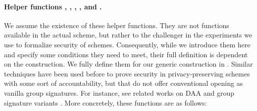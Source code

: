 \paragraph{Helper functions \SimSetup, \ExtractIssue, \ExtractSign,
  \IdentifyCred, and \IdentifyUK.} We assume the existence of these helper
functions. They are not functions available in the actual scheme, but rather to
the challenger in the experiments we use to formalize security of \UAS schemes.
Consequently, while we introduce them here and specify some conditions they need
to meet, their full definition is dependent on the construction. We fully define
them for our generic construction \CUASGen in . Similar
techniques have been used before to prove security in privacy-preserving schemes
with some sort of accountability, but that do not offer conventional opening as
vanilla group signatures. For instance, see related works on DAA
\cite{bfg+11,cdl16} and group signature variants \cite{dl21,fgl21,gl19,lnpy21}.
More concretely, these functions are as follows:

